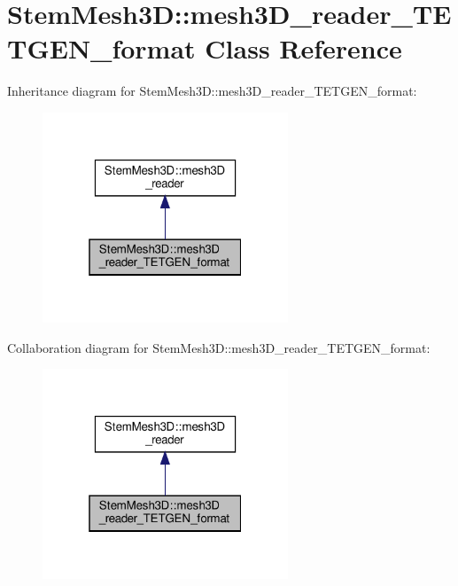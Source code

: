 \hypertarget{classStemMesh3D_1_1mesh3D__reader__TETGEN__format}{}\section{Stem\+Mesh3D\+:\+:mesh3\+D\+\_\+reader\+\_\+\+T\+E\+T\+G\+E\+N\+\_\+format Class Reference}
\label{classStemMesh3D_1_1mesh3D__reader__TETGEN__format}


Inheritance diagram for Stem\+Mesh3D\+:\+:mesh3\+D\+\_\+reader\+\_\+\+T\+E\+T\+G\+E\+N\+\_\+format\+:\nopagebreak
\begin{figure}[H]
\begin{center}
\leavevmode
\includegraphics[width=208pt]{classStemMesh3D_1_1mesh3D__reader__TETGEN__format__inherit__graph}
\end{center}
\end{figure}


Collaboration diagram for Stem\+Mesh3D\+:\+:mesh3\+D\+\_\+reader\+\_\+\+T\+E\+T\+G\+E\+N\+\_\+format\+:\nopagebreak
\begin{figure}[H]
\begin{center}
\leavevmode
\includegraphics[width=208pt]{classStemMesh3D_1_1mesh3D__reader__TETGEN__format__coll__graph}
\end{center}
\end{figure}
